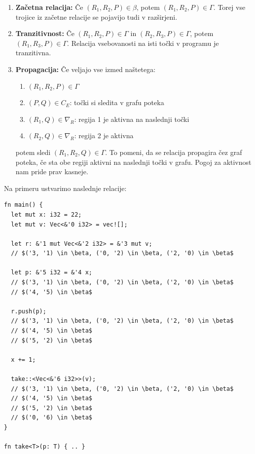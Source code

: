 \documentclass[a4paper,12pt,openright]{book}
\begin{document}
\begin{enumerate}
	\item \textbf{Začetna relacija: }Če $(R_1, R_2, P) \in \beta$, potem $(R_1, R_2, P) \in \Gamma$. Torej vse trojice
	      iz začetne relacije se pojavijo tudi v razširjeni.
	\item \textbf{Tranzitivnost:} Če $(R_1, R_2, P) \in \Gamma$ in $(R_2, R_3, P) \in \Gamma$, potem $(R_1, R_3, P) \in \Gamma$.
	      Relacija vsebovanosti na isti točki v programu je tranzitivna.
	\item \textbf{Propagacija:} Če veljajo vse izmed naštetega:
	      \begin{enumerate}
		      \item $(R_1, R_2, P) \in \Gamma$
		      \item $(P, Q) \in C_E$: točki si sledita v grafu poteka
		      \item $(R_1, Q) \in \nabla_R$: regija 1 je aktivna na naslednji točki
		      \item $(R_2, Q) \in \nabla_R$: regija 2 je aktivna
	      \end{enumerate}
	      potem sledi $(R_1, R_2, Q) \in \Gamma$. To pomeni, da se relacija propagira čez graf poteka, če sta obe
	      regiji aktivni na naslednji točki v grafu. Pogoj za aktivnost nam pride prav kasneje.
\end{enumerate}

Na primeru ustvarimo naslednje relacije:

\begin{listing}[!ht]
	\begin{verbatim}
fn main() {
  let mut x: i32 = 22;
  let mut v: Vec<&'0 i32> = vec![];

  let r: &'1 mut Vec<&'2 i32> = &'3 mut v;
  // $('3, '1) \in \beta, ('0, '2) \in \beta, ('2, '0) \in \beta$

  let p: &'5 i32 = &'4 x;
  // $('3, '1) \in \beta, ('0, '2) \in \beta, ('2, '0) \in \beta$
  // $('4, '5) \in \beta$

  r.push(p);
  // $('3, '1) \in \beta, ('0, '2) \in \beta, ('2, '0) \in \beta$
  // $('4, '5) \in \beta$
  // $('5, '2) \in \beta$
  
  x += 1;

  take::<Vec<&'6 i32>>(v);
  // $('3, '1) \in \beta, ('0, '2) \in \beta, ('2, '0) \in \beta$
  // $('4, '5) \in \beta$
  // $('5, '2) \in \beta$
  // $('0, '6) \in \beta$
}

fn take<T>(p: T) { .. }
\end{verbatim}
	\caption{Relacija vsebovanosti}
	\label{listing:subsetRelations}
\end{listing}
\end{document}

